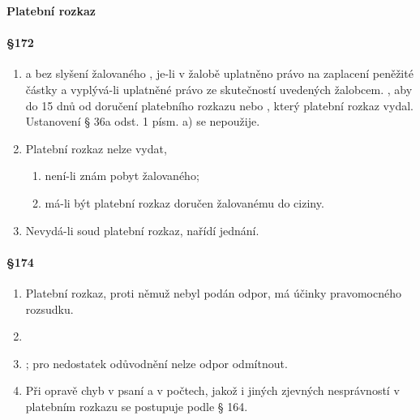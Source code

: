 \textbf{\Large Platební rozkaz}

\paragraph{\S 172}

\begin{enumerate}[label={(\arabic*)}]
  \item {} a bez slyšení žalovaného , je-li v žalobě uplatněno právo na zaplacení peněžité částky a vyplývá-li uplatněné právo ze skutečností uvedených žalobcem. , aby do 15 dnů od doručení platebního rozkazu  nebo , který platební rozkaz vydal. Ustanovení § 36a odst. 1 písm. a) se nepoužije.
  \item Platební rozkaz nelze vydat,
  \begin{enumerate}[label={\alph*)}]
    \item není-li znám pobyt žalovaného;
    \item má-li být platební rozkaz doručen žalovanému do ciziny.
  \end{enumerate}
  \item Nevydá-li soud platební rozkaz, nařídí jednání.
\end{enumerate}

\paragraph{\S 174}

\begin{enumerate}[label={(\arabic*)}]
  \item Platební rozkaz, proti němuž nebyl podán odpor, má účinky pravomocného rozsudku.
  \item {} 
  \item {}; pro nedostatek odůvodnění nelze odpor odmítnout. 
  \item Při opravě chyb v psaní a v počtech, jakož i jiných zjevných nesprávností v platebním rozkazu se postupuje podle § 164.
\end{enumerate}

